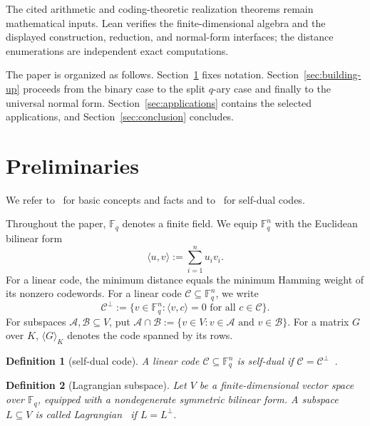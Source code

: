 \documentclass[12pt]{article}
\newtheorem{defn}{Definition}[section]
\newcommand{\F}{\mathbb{F}}
\begin{document}
The cited arithmetic and coding-theoretic realization theorems remain
mathematical inputs. Lean verifies the finite-dimensional algebra and the
displayed construction, reduction, and normal-form interfaces; the distance
enumerations are independent exact computations.

The paper is organized as follows. Section~\ref{sec:background} fixes
notation. Section~\ref{sec:building-up} proceeds from the binary case to the
split \(q\)-ary case and finally to the universal normal form.
Section~\ref{sec:applications} contains the selected applications, and
Section~\ref{sec:conclusion} concludes.


\section{Preliminaries}
\label{sec:background}


We refer to~\cite{HuffmanPless} for basic concepts and facts and to~\cite{self-dual} for self-dual codes.

Throughout the paper, \(\F_q\) denotes a finite field. We equip \(\F_q^n\) with the Euclidean bilinear form
\[
\langle u,v\rangle := \sum_{i=1}^n u_i v_i.
\]
For a linear code, the minimum distance equals the minimum Hamming weight of
its nonzero codewords.  For a linear code
$\mathcal C\subseteq\F_q^n$, we write
\[
\mathcal C^\perp :=
\{v \in \F_q^n : \langle v,c\rangle =0\text{ for all }c\in\mathcal C\}.
\]
For subspaces \(\mathcal A,\mathcal B\subseteq V\), put
\(\mathcal A\cap\mathcal B:=\{v\in V:v\in\mathcal A\text{ and }
v\in\mathcal B\}\).  For a matrix \(G\) over \(K\),
\(\langle G\rangle_K\) denotes the code spanned by its rows.

\begin{defn}[self-dual code]\label{def:sd}
{\rm
A linear code $\mathcal C\subseteq\F_q^n$ is \emph{self-dual} if
$\mathcal C=\mathcal C^\perp$~\cite{Pless1965}.
}
\end{defn}

\begin{defn}[Lagrangian subspace]\label{def:lagrangian}
{\rm
Let \(V\) be a finite-dimensional vector space over \(\F_q\), equipped
with a nondegenerate symmetric bilinear form. A subspace \(L\subseteq V\)
is called \emph{Lagrangian}~\cite{Mon,Ser} if \(L=L^\perp\).
}
\end{defn}
\end{document}
